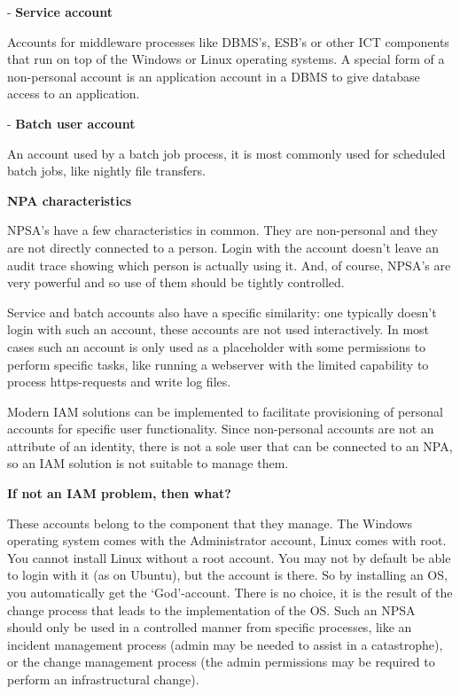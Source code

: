 - \textbf{Service account}

Accounts for middleware processes like DBMS's, ESB's or other ICT
components that run on top of the Windows or Linux operating systems. A
special form of a non-personal account is an application account in a
DBMS to give database access to an application.

- \textbf{Batch user account}

An account used by a batch job process, it is most commonly used for
scheduled batch jobs, like nightly file transfers.

\textbf{NPA characteristics}

NPSA's have a few characteristics in common. They are non-personal and
they are not directly connected to a person. Login with the account
doesn't leave an audit trace showing which person is actually using it.
And, of course, NPSA's are very powerful and so use of them should be
tightly controlled.

Service and batch accounts also have a specific similarity: one
typically doesn't login with such an account, these accounts are not
used interactively. In most cases such an account is only used as a
placeholder with some permissions to perform specific tasks, like
running a webserver with the limited capability to process
https-requests and write log files.

Modern IAM solutions can be implemented to facilitate provisioning of
personal accounts for specific user functionality. Since non-personal
accounts are not an attribute of an identity, there is not a sole user
that can be connected to an NPA, so an IAM solution is not suitable to
manage them.

\textbf{If not an IAM problem, then what?}

These accounts belong to the component that they manage. The Windows
operating system comes with the Administrator account, Linux comes with
root. You cannot install Linux without a root account. You may not by
default be able to login with it (as on Ubuntu), but the account is
there. So by installing an OS, you automatically get the `God'‑account.
There is no choice, it is the result of the change process that leads to
the implementation of the OS. Such an NPSA should only be used in a
controlled manner from specific processes, like an incident management
process (admin may be needed to assist in a catastrophe), or the change
management process (the admin permissions may be required to perform an
infrastructural change).

